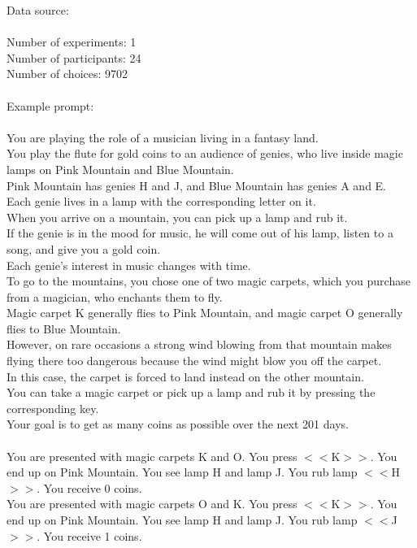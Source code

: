 \documentclass[pdflatex,sn-nature]{sn-jnl}%
\theoremstyle{thmstyleone}%
\theoremstyle{thmstyletwo}%
\theoremstyle{thmstylethree}%
\begin{document}
Data source: \cite{feher2020humans} \\ $~$ \\
Number of experiments: 1 $~$\\ 
Number of participants: 24 $~$\\ 
Number of choices: 9702 $~$\\ 
 $~$\\ 
Example prompt: $~$\\ 
 $~$\\ 
You are playing the role of a musician living in a fantasy land. $~$\\ 
You play the flute for gold coins to an audience of genies, who live inside magic lamps on Pink Mountain and Blue Mountain. $~$\\ 
Pink Mountain has genies H and J, and Blue Mountain has genies A and E. $~$\\ 
Each genie lives in a lamp with the corresponding letter on it. $~$\\ 
When you arrive on a mountain, you can pick up a lamp and rub it. $~$\\ 
If the genie is in the mood for music, he will come out of his lamp, listen to a song, and give you a gold coin. $~$\\ 
Each genie’s interest in music changes with time. $~$\\ 
To go to the mountains, you chose one of two magic carpets, which you purchase from a magician, who enchants them to fly. $~$\\ 
Magic carpet K generally flies to Pink Mountain, and magic carpet O generally flies to Blue Mountain. $~$\\ 
However, on rare occasions a strong wind blowing from that mountain makes flying there too dangerous because the wind might blow you off the carpet. $~$\\ 
In this case, the carpet is forced to land instead on the other mountain. $~$\\ 
You can take a magic carpet or pick up a lamp and rub it by pressing the corresponding key. $~$\\ 
Your goal is to get as many coins as possible over the next 201 days. $~$\\ 
 $~$\\ 
You are presented with magic carpets K and O. You press $<<$K$>>$. You end up on Pink Mountain. You see lamp H and lamp J. You rub lamp $<<$H$>>$. You receive 0 coins. $~$\\ 
You are presented with magic carpets O and K. You press $<<$K$>>$. You end up on Pink Mountain. You see lamp H and lamp J. You rub lamp $<<$J$>>$. You receive 1 coins. $~$\\ 
\end{document}
